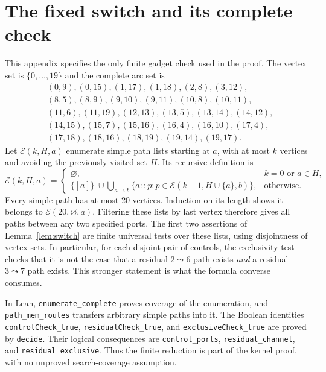 \documentclass[11pt,a4paper]{article}
\begin{document}
\appendix
\section{The fixed switch and its complete check}\label{sec:switch}
This appendix specifies the only finite gadget check used in the proof.
The vertex set is $\{0,\ldots,19\}$ and the complete arc set is
\begin{align*}
 &(0,9),(0,15),(1,17),(1,18),(2,8),(3,12),\\
 &(8,5),(8,9),(9,10),(9,11),(10,8),(10,11),\\
 &(11,6),(11,19),(12,13),(13,5),(13,14),(14,12),\\
 &(14,15),(15,7),(15,16),(16,4),(16,10),(17,4),\\
 &(17,18),(18,16),(18,19),(19,14),(19,17).
\end{align*}
Let $\mathcal E(k,H,a)$ enumerate simple path lists starting at $a$, with
at most $k$ vertices and avoiding the previously visited set $H$. Its
recursive definition is
\[
\mathcal E(k,H,a)=
\begin{cases}
 \varnothing,& k=0\text{ or }a\in H,\\
 \{[a]\}\ \cup\displaystyle\bigcup_{a\to b}
 \{a::p:p\in\mathcal E(k-1,H\cup\{a\},b)\},&\text{otherwise}.
\end{cases}
\]
Every simple path has at most 20 vertices. Induction on its length shows
it belongs to $\mathcal E(20,\varnothing,a)$. Filtering these lists by
last vertex therefore gives all paths between any two specified ports.
The first two assertions of Lemma~\ref{lem:switch} are finite universal
tests over these lists, using disjointness of vertex sets. In particular,
for each disjoint pair of controls, the exclusivity test checks that it is
not the case that a residual $2\leadsto6$ path exists \emph{and} a residual
$3\leadsto7$ path exists. This stronger statement is what the formula
converse consumes.

In Lean, \texttt{enumerate\_complete} proves coverage of the enumeration,
and \texttt{path\_mem\_routes} transfers arbitrary simple paths into it.
The Boolean identities \texttt{controlCheck\_true},
\texttt{residualCheck\_true}, and \texttt{exclusiveCheck\_true} are proved
by \texttt{decide}. Their logical consequences are
\texttt{control\_ports}, \texttt{residual\_channel}, and
\texttt{residual\_exclusive}. Thus the finite reduction is part of the
kernel proof, with no unproved search-coverage assumption.
\end{document}
